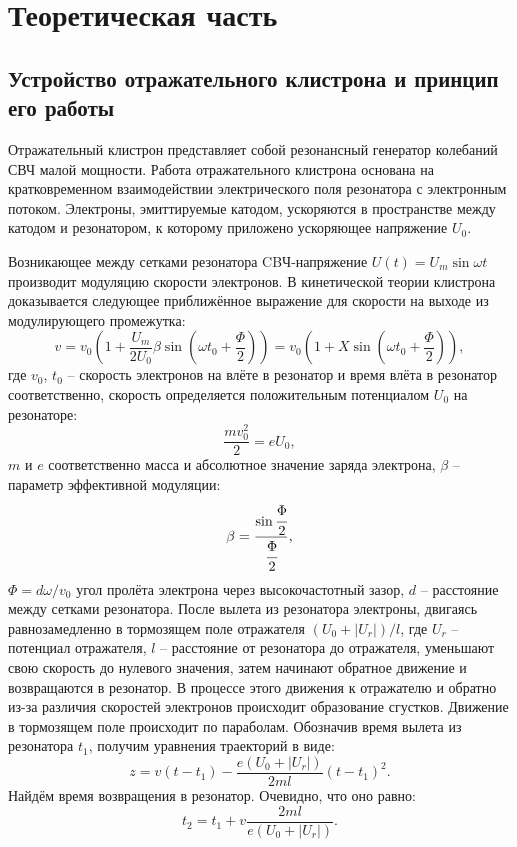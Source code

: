 \documentclass[a4paper,14pt]{extarticle}
\begin{document}
	\section{Теоретическая часть}
	\subsection{Устройство отражательного клистрона и принцип его работы}
	Отражательный клистрон представляет собой резонансный генератор колебаний СВЧ малой мощности.
	Работа отражательного клистрона основана на кратковременном взаимодействии электрического поля резонатора с электронным потоком. 
	Электроны,  эмиттируемые  катодом,  ускоряются  в  пространстве  между катодом и резонатором, к которому приложено ускоряющее напряжение $U_0$.
	
	Возникающее между сетками резонатора CBЧ-напряжение $U(t)=U_m \sin \omega t$ производит модуляцию скорости электронов. В кинетической
	теории клистрона доказывается следующее приближённое выражение для скорости на выходе из модулирующего промежутка:
	\begin{equation}
	v = v_0 \left(1 + \frac{U_m}{2U_0} \beta \sin \left(\omega t_0 + \frac{\Phi}{2}\right) \right) = v_0 \left(1 + X \sin \left(\omega t_0 + \frac{\Phi}{2}\right) \right) ,
	\end{equation}
	где $v_0$, $t_0$ -- скорость электронов на влёте в резонатор и время влёта в резонатор соответственно, скорость определяется положительным потенциалом $U_0$ на резонаторе:
	\[
	\frac{mv_0^2}{2} = e U_0,
	\]
	$m$ и $e$ соответственно масса и абсолютное значение заряда электрона, $\beta$ -- параметр эффективной модуляции:
	\[
	\beta = \frac{\sin \cfrac{\Phi}{2}}{\cfrac{\Phi}{2}},
	\]
	$\Phi = d\omega/v_0$ угол пролёта электрона через высокочастотный зазор, $d$ -- расстояние между сетками резонатора.
	После вылета из резонатора электроны, двигаясь равнозамедленно в тормозящем поле отражателя $(U_0 + |U_r|)/l$, где $U_r$ -- потенциал отражателя, $l$ -- расстояние от резонатора до отражателя, уменьшают свою скорость до нулевого значения, затем начинают обратное движение и возвращаются в резонатор. В процессе этого движения к отражателю и обратно из-за различия скоростей электронов происходит образование сгустков. Движение в тормозящем поле происходит по параболам. Обозначив время вылета из резонатора $t_1$, получим уравнения траекторий в виде:
	\begin{equation}
	z = v (t - t_1) - \frac{e(U_0 + |U_r|)}{2ml} (t - t_1)^2.
	\end{equation}
	Найдём время возвращения в резонатор. Очевидно, что оно равно:
	\begin{equation}
	t_2 = t_1 +  v \frac{2ml}{e(U_0 + |U_r|)}.
	\end{equation}
	
\end{document}
